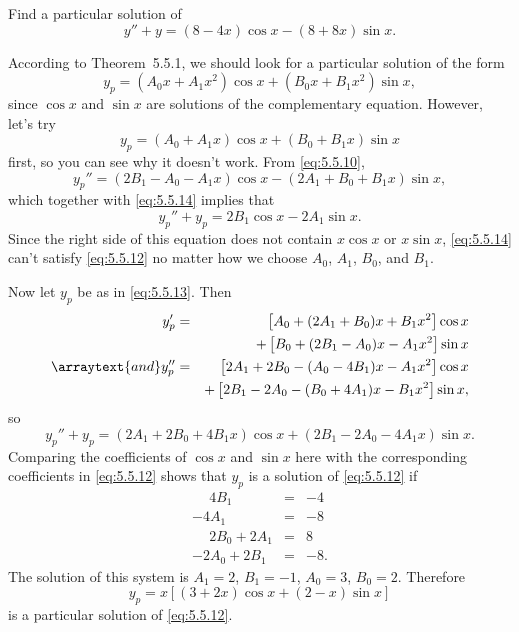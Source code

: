\setcounter{example}{3}
\setcounter{equation}{11}
\begin{example}
  \label{example:5.5.4} \rm Find a particular solution of
  \begin{equation}
    \label{eq:5.5.12}y''+y=(8-4x)\cos x-(8+8x)\sin x.
  \end{equation}
\end{example}
\setcounter{equation}{12}
\begin{examplesolution}
\solution According to Theorem~5.5.1, we should look for a particular solution of the
form
\begin{equation}
  \label{eq:5.5.13}y_{p}=(A_{0}x+A_{1}x^{2})\cos x+(B_{0}x+B_{1}x^{2})\sin x,
\end{equation}
since $\cos x$ and $\sin x$ are solutions of the complementary equation. However, let's try
\begin{equation}
  \label{eq:5.5.14}y_{p}=(A_{0}+A_{1}x)\cos x+(B_{0}+B_{1}x)\sin x
\end{equation}
first, so you can see why it doesn't work. From \eqref{eq:5.5.10},
\[
  y_{p}''=(2B_{1}-A_{0}-A_{1}x)\cos x-(2A_{1}+B_{0}+B_{1}x)\sin x,
\]
which together with \eqref{eq:5.5.14} implies that
\[
  y_{p}''+y_{p}=2B_{1}\cos x-2A_{1}\sin x.
\]
Since the right side of this equation does not contain $x\cos x$ or $x\sin x$, \eqref{eq:5.5.14}
can't satisfy \eqref{eq:5.5.12} no matter how we choose $A_{0}$, $A_{1}$, $B_{0}$, and $B_{1}$.

Now let $y_{p}$ be as in \eqref{eq:5.5.13}. Then
\begin{eqnarray*}
  y_{p}'                 & = & \left[A_{0}+(2A_{1}+B_{0})x+B_{1}x^{2}\right]\cos x         \\
                         &   & +\left[B_{0}+(2B_{1}-A_{0})x-A_{1}x^{2}\right]\sin x        \\
  \arraytext{and}y_{p}'' & = & \left[2A_{1}+2B_{0}-(A_{0}-4B_{1})x-A_{1}x^{2}\right]\cos x \\
                         &   & +\left[2B_{1}-2A_{0}-(B_{0}+4A_{1})x-B_{1}x^{2}\right]\sin x,
\end{eqnarray*}
so
\[
  y_{p}''+y_{p}=(2A_{1}+2B_{0}+4B_{1}x)\cos x+(2B_{1}-2A_{0}-4A_{1}x)\sin x.
\]
Comparing the coefficients of $\cos x$ and $\sin x$ here with the corresponding coefficients in
\eqref{eq:5.5.12} shows that $y_{p}$ is a solution of \eqref{eq:5.5.12} if
\[
  \begin{array}{rcr}
    \phantom{-}4B_{1}        & = & -4\phantom{.} \\
    -4A_{1}                  & = & -8\phantom{.} \\
    \phantom{-}2B_{0}+2A_{1} & = & 8\phantom{.}  \\
    -2A_{0}+2B_{1}           & = & -8.
  \end{array}
\]
The solution of this system is $A_{1}=2$, $B_{1}=-1$, $A_{0}=3$, $B_{0}=2$. Therefore
\[
  y_{p}=x\left[(3+2x)\cos x+(2-x)\sin x\right]
\]
is a particular solution of \eqref{eq:5.5.12}.
\end{examplesolution}

